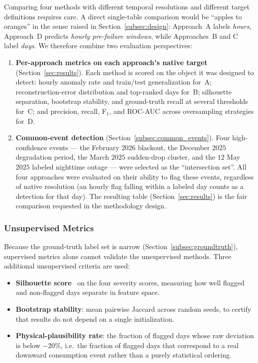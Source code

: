 \documentclass[11pt]{article}
\begin{document}
\begin{enumerate}[leftmargin=1.5em,itemsep=1pt]
Comparing four methods with different temporal resolutions and different target definitions requires care. A direct single-table comparison would be ``apples to oranges'' in the sense raised in Section~\ref{subsec:design}: Approach~A labels \emph{hours}, Approach~D predicts \emph{hourly pre-failure windows}, while Approaches~B and C label \emph{days}. We therefore combine two evaluation perspectives:

\begin{enumerate}[leftmargin=1.5em,itemsep=2pt]
  \item \textbf{Per-approach metrics on each approach's native target} (Section~\ref{sec:results}). Each method is scored on the object it was designed to detect: hourly anomaly rate and train/test generalization for~A; reconstruction-error distribution and top-ranked days for~B; silhouette separation, bootstrap stability, and ground-truth recall at several thresholds for~C; and precision, recall, F$_1$, and ROC-AUC across oversampling strategies for~D.

  \item \textbf{Common-event detection} (Section~\ref{subsec:common_events}). Four high-confidence events --- the February $2026$ blackout, the December $2025$ degradation period, the March $2025$ sudden-drop cluster, and the $12$ May $2025$ labeled nighttime outage --- were selected as the ``intersection set''. All four approaches were evaluated on their ability to flag these events, regardless of native resolution (an hourly flag falling within a labeled day counts as a detection for that day). The resulting table (Section~\ref{sec:results}) is the fair comparison requested in the methodology design.
\end{enumerate}

\subsubsection*{Unsupervised Metrics}
Because the ground-truth label set is narrow (Section~\ref{subsec:groundtruth}), supervised metrics alone cannot validate the unsupervised methods. Three additional unsupervised criteria are used:

\begin{itemize}[leftmargin=1.5em,itemsep=1pt]
  \item \textbf{Silhouette score}~\cite{rousseeuw1987silhouettes} on the four severity scores, measuring how well flagged and non-flagged days separate in feature space.
  \item \textbf{Bootstrap stability}: mean pairwise Jaccard across random seeds, to certify that results do not depend on a single initialization.
  \item \textbf{Physical-plausibility rate}: the fraction of flagged days whose raw deviation is below $-20\%$, i.e.\ the fraction of flagged days that correspond to a real downward consumption event rather than a purely statistical ordering.
\end{itemize}


\end{enumerate}
\end{document}
